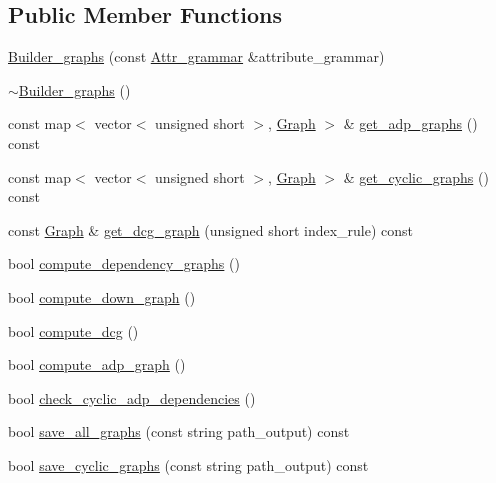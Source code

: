 \subsection*{Public Member Functions}
\begin{DoxyCompactItemize}
\item 
\hyperlink{classgenevalmag_1_1Builder__graphs_a6220015a296aed77686fd9382e2917e3}{Builder\_\-graphs} (const \hyperlink{classgenevalmag_1_1Attr__grammar}{Attr\_\-grammar} \&attribute\_\-grammar)
\item 
\hyperlink{classgenevalmag_1_1Builder__graphs_a1185fa86f07038e594e0292a7d6c5f36}{$\sim$Builder\_\-graphs} ()
\item 
const map$<$ vector$<$ unsigned short $>$, \hyperlink{namespacegenevalmag_a4a96de9ebfc7d48233406ab9cad55cb5}{Graph} $>$ \& \hyperlink{classgenevalmag_1_1Builder__graphs_a96271a5edae352ea39ad4f627877d8a4}{get\_\-adp\_\-graphs} () const 
\item 
const map$<$ vector$<$ unsigned short $>$, \hyperlink{namespacegenevalmag_a4a96de9ebfc7d48233406ab9cad55cb5}{Graph} $>$ \& \hyperlink{classgenevalmag_1_1Builder__graphs_a4abbda95aa3d42fc06328c31ff5d63e1}{get\_\-cyclic\_\-graphs} () const 
\item 
const \hyperlink{namespacegenevalmag_a4a96de9ebfc7d48233406ab9cad55cb5}{Graph} \& \hyperlink{classgenevalmag_1_1Builder__graphs_a5850a6c7a2248394ead2b63aeca7ff9b}{get\_\-dcg\_\-graph} (unsigned short index\_\-rule) const 
\item 
bool \hyperlink{classgenevalmag_1_1Builder__graphs_acd8de1287317a25e559f4aede929fe66}{compute\_\-dependency\_\-graphs} ()
\item 
bool \hyperlink{classgenevalmag_1_1Builder__graphs_adc8ee86b8d769a7b42c43361fa7076cb}{compute\_\-down\_\-graph} ()
\item 
bool \hyperlink{classgenevalmag_1_1Builder__graphs_af41d4e9683653a0d47fa45406a2ca594}{compute\_\-dcg} ()
\item 
bool \hyperlink{classgenevalmag_1_1Builder__graphs_a497bbd54a1f3197e22743dcf2ad27da3}{compute\_\-adp\_\-graph} ()
\item 
bool \hyperlink{classgenevalmag_1_1Builder__graphs_a278e4c659e6fd91e1f3fc8d37a0edea9}{check\_\-cyclic\_\-adp\_\-dependencies} ()
\item 
bool \hyperlink{classgenevalmag_1_1Builder__graphs_a95525c606a1189a5fe0096f72938555d}{save\_\-all\_\-graphs} (const string path\_\-output) const 
\item 
bool \hyperlink{classgenevalmag_1_1Builder__graphs_a81bf79709c133320f4d40cdee1f61466}{save\_\-cyclic\_\-graphs} (const string path\_\-output) const 

\end{DoxyCompactItemize}
